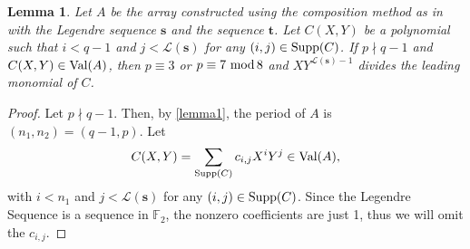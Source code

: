 \documentclass[12pt]{article}
\renewcommand{\mod}{\ \textup{mod}\,}
\newcommand{\supp}{\textup{Supp}}
\newcommand{\val}{\textup{Val}}
\newcommand{\legendre}{\mathscr{L}(\mathbf{s})}
\newtheorem{lemma}[theorem]{Lemma}
\theoremstyle{definition}
\theoremstyle{definition}
\theoremstyle{definition}
\theoremstyle{plain}
\theoremstyle{plain}
\numberwithin{equation}{section}
\begin{document}
\begin{lemma}\label{main_thm}
Let $A$ be the array constructed using the composition method as in  with the Legendre sequence $\mathbf{s}$ and the sequence $\mathbf{t}$. 
Let $C(X,Y)$ be a polynomial such that $i<q-1$ and $j<\legendre$ for any $(i,j)\in\supp(C)$.
If $p \nmid q-1$ and $C(X,Y)\in\val(A)$, then $p \equiv 3$ or $p \equiv 7\mod 8$ and  $XY^{\legendre-1}$ divides the leading monomial of $C$.
\end{lemma}
\begin{proof}
    Let $p \nmid q-1$. 
    Then, by \cref{lemma1}, the period of $A$ is $(n_1,n_2) = (q-1,p)$. 
    Let
    \[
        C(X,Y) = \sum_{\supp(C)} c_{i,j} X^iY^j \in \val(A),
    \]
    with $i<n_1$ and $j<\legendre$ for any $(i,j) \in \supp(C)$. 
    Since the Legendre Sequence is a sequence in $\mathbb{F}_2$, the nonzero coefficients are just 1, thus we will omit the $c_{i,j}$. 
    

\end{proof}
\end{document}
